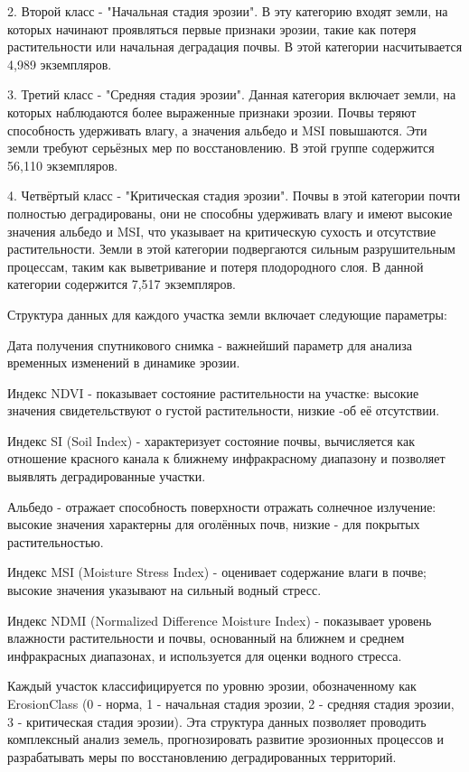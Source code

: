 \begin{multicols}{2}
2. Второй класс - "Начальная стадия эрозии". В эту категорию входят
земли, на которых начинают проявляться первые признаки эрозии, такие
как потеря растительности или начальная деградация почвы. В этой
категории насчитывается 4,989 экземпляров.

3. Третий класс - "Средняя стадия эрозии". Данная категория включает
земли, на которых наблюдаются более выраженные признаки эрозии. Почвы
теряют способность удерживать влагу, а значения альбедо и MSI
повышаются. Эти земли требуют серьёзных мер по восстановлению. В этой
группе содержится 56,110 экземпляров.

4. Четвёртый класс - "Критическая стадия эрозии". Почвы в этой категории
почти полностью деградированы, они не способны удерживать влагу и
имеют высокие значения альбедо и MSI, что указывает на критическую
сухость и отсутствие растительности. Земли в этой категории
подвергаются сильным разрушительным процессам, таким как выветривание
и потеря плодородного слоя. В данной категории содержится 7,517
экземпляров.

Структура данных для каждого участка земли включает следующие параметры:

Дата получения спутникового снимка - важнейший параметр для анализа
временных изменений в динамике эрозии.

Индекс NDVI - показывает состояние растительности на участке: высокие
значения свидетельствуют о густой растительности, низкие -об её
отсутствии.

Индекс SI (Soil Index) - характеризует состояние почвы, вычисляется как
отношение красного канала к ближнему инфракрасному диапазону и позволяет
выявлять деградированные участки.

Альбедо - отражает способность поверхности отражать солнечное излучение:
высокие значения характерны для оголённых почв, низкие - для покрытых
растительностью.

Индекс MSI (Moisture Stress Index) - оценивает содержание влаги в почве;
высокие значения указывают на сильный водный стресс.

Индекс NDMI (Normalized Difference Moisture Index) - показывает уровень
влажности растительности и почвы, основанный на ближнем и среднем
инфракрасных диапазонах, и используется для оценки водного стресса.

Каждый участок классифицируется по уровню эрозии, обозначенному как
ErosionClass (0 - норма, 1 - начальная стадия эрозии, 2 - средняя стадия
эрозии, 3 - критическая стадия эрозии). Эта структура данных позволяет
проводить комплексный анализ земель, прогнозировать развитие эрозионных
процессов и разрабатывать меры по восстановлению деградированных
территорий.


\end{multicols}
